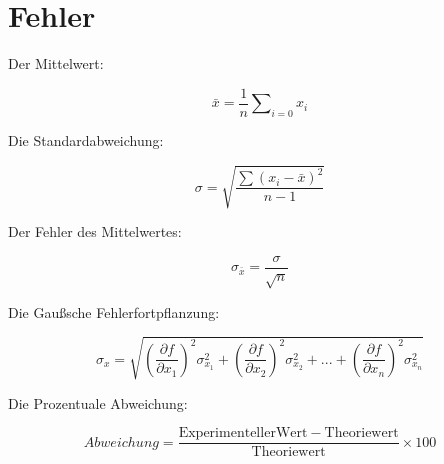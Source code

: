 \section{Fehler}
\label{sec:Fehler}
Der Mittelwert:
\begin{center}
  \begin{equation}
    \label{eq:Mittelwert}
  \bar{x} = \frac{1}{n} \sum \nolimits_{i=0} x_i
  \end{equation} 
\end{center}

Die Standardabweichung:
\begin{center}
  \begin{equation}
    \label{eq:standardabweichung}
    \sigma=\sqrt{\frac{\sum(x_i-\bar{x})^2}{n-1}}
  \end{equation}
\end{center}

Der Fehler des Mittelwertes:
\begin{center}
  \begin{equation}
    \label{eq:mittelwertfehler}
    \sigma_{\bar{x}}=\frac{\sigma}{\sqrt{n}}
  \end{equation}

  
\end{center}


Die Gaußsche Fehlerfortpflanzung:
\begin{center}
\begin{equation}
  \label{eq:gaussfehler}  
\sigma_x=\sqrt{(\frac{\partial f}{\partial x_1})^2\sigma_{x_1}^2+(\frac{\partial f}{\partial x_2})^2\sigma_{x_2}^2+...+(\frac{\partial f}{\partial x_n})^2\sigma_{x_n}^2}
\end{equation}
\end{center}

Die Prozentuale Abweichung:

\begin{center}
  \begin{equation}
    \label{eq:prozentuale} 
    Abweichung=\frac{\mathrm{Experimenteller Wert - Theoriewert}}{\mathrm{Theoriewert}}\times 100 
   \end{equation}
  \end{center}